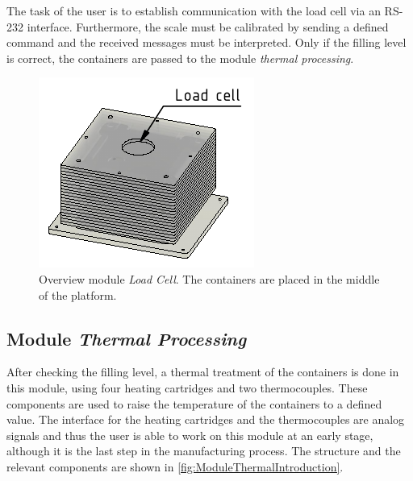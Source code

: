 	    The task of the user is to establish communication with the load cell via an RS-232 interface. Furthermore, the scale must be calibrated by sending a defined command and the received messages must be interpreted. Only if the filling level is correct, the containers are passed to the module \textit{thermal processing}.
    	\begin{figure}[htp]
    		\centering
    	    \includegraphics{figures/CadLoad.pdf}
    		\caption[Overview module \textit{Load Cell}.]{Overview module \textit{Load Cell}. The containers are placed in the middle of the platform. }
    		\label{fig:ModuleLoadCellIntroduction}
    	\end{figure}
	
	
	\subsection{Module \textit{Thermal Processing}}
	After checking the filling level, a thermal treatment of the containers is done in this module, using four heating cartridges and two thermocouples. These components are used to raise the temperature of the containers to a defined value. The interface for the heating cartridges and the thermocouples are analog signals and thus the user is able to work on this module at an early stage, although it is the last step in the manufacturing process. The structure and the relevant components are shown in \autoref{fig:ModuleThermalIntroduction}.\\
	
